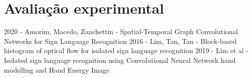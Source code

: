 \chapter{Avaliação experimental}
\label{cap:avaliacao}

%


2020 - Amorim, Macedo, Zanchettin - Spatial-Temporal Graph Convolutional Networks for Sign Language Recognition
    2016 - Lim, Tan, Tan - Block-based histogram of optical flow for isolated sign language recognition
2019 - Lim et al - Isolated sign language recognition using Convolutional Neural Network hand modelling and Hand Energy Image